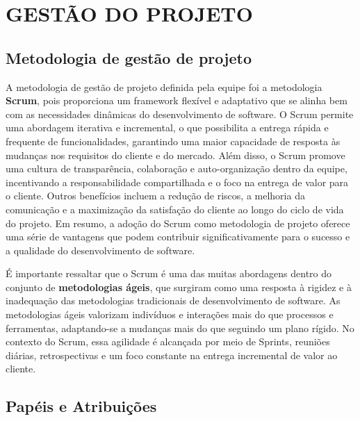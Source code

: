\chapter{GESTÃO DO PROJETO}
\label{requisitos-aplicacoes}

\section{Metodologia de gestão de projeto}

A metodologia de gestão de projeto definida pela equipe foi a metodologia \textbf{Scrum}, pois proporciona um framework flexível e adaptativo que se alinha bem com as necessidades dinâmicas do desenvolvimento de software. O Scrum permite uma abordagem iterativa e incremental, o que possibilita a entrega rápida e frequente de funcionalidades, garantindo uma maior capacidade de resposta às mudanças nos requisitos do cliente e do mercado. Além disso, o Scrum promove uma cultura de transparência, colaboração e auto-organização dentro da equipe, incentivando a responsabilidade compartilhada e o foco na entrega de valor para o cliente. Outros benefícios incluem a redução de riscos, a melhoria da comunicação e a maximização da satisfação do cliente ao longo do ciclo de vida do projeto. Em resumo, a adoção do Scrum como metodologia de projeto oferece uma série de vantagens que podem contribuir significativamente para o sucesso e a qualidade do desenvolvimento de software.

 É importante ressaltar que o Scrum é uma das muitas abordagens dentro do conjunto de \textbf{metodologias ágeis}, que surgiram como uma resposta à rigidez e à inadequação das metodologias tradicionais de desenvolvimento de software. As metodologias ágeis valorizam indivíduos e interações mais do que processos e ferramentas, adaptando-se a mudanças mais do que seguindo um plano rígido. No contexto do Scrum, essa agilidade é alcançada por meio de Sprints, reuniões diárias, retrospectivas e um foco constante na entrega incremental de valor ao cliente. 

\section{Papéis e Atribuições}

